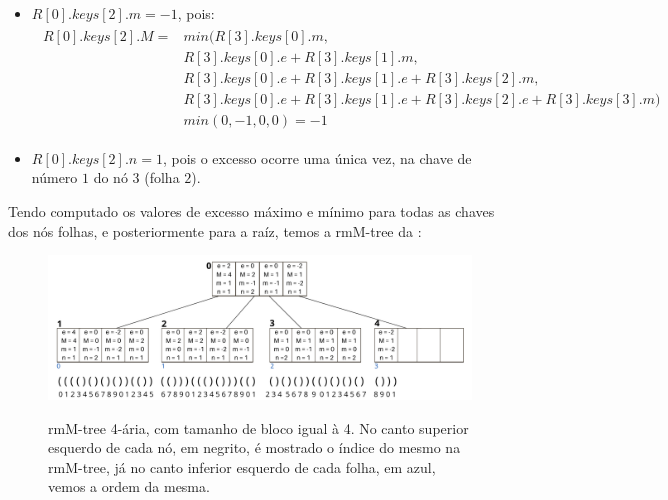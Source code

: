 \begin{example}
\begin{itemize}
    \item $R[0].keys[2].m = -1$, pois:
    \begin{eqnarray*}
        \begin{split}
            R[0].keys[2].M =& min(R[3].keys[0].m, \\
            &   R[3].keys[0].e + R[3].keys[1].m, \\
            &  R[3].keys[0].e + R[3].keys[1]. e + R[3].keys[2].m,  \\
            &   R[3].keys[0].e + R[3].keys[1]. e + R[3].keys[2].e +  R[3].keys[3].m)\\
            &   min(0,-1,0,0) = -1
        \end{split}
    \end{eqnarray*}
    
    \item $R[0].keys[2].n = 1$, pois o excesso ocorre uma única vez, na chave de número $1$ do nó $3$ (folha $2$).
\end{itemize}

Tendo computado os valores de excesso máximo e mínimo para todas as chaves dos nós folhas, e posteriormente para a raíz, temos a rmM-tree da :
    \begin{figure}[h!]
    \centering
      \caption[rmM-tree 4-ária.]{rmM-tree 4-ária, com tamanho de bloco igual à 4. No canto superior esquerdo de cada nó, em negrito,
        é mostrado o índice do mesmo na rmM-tree, já no canto inferior esquerdo de cada folha, em azul, vemos a ordem da mesma.}
      \includegraphics[width=\columnwidth]{images/rmm-tree-kary.png}
      \label{fig:rmm-tree-k}
    \end{figure}
    
\end{example}


